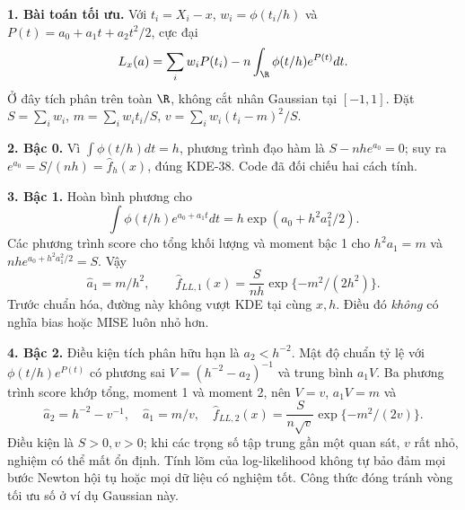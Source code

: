 \begin{solution}
\textbf{1. Bài toán tối ưu.} Với $t_i=X_i-x$, $w_i=\phi(t_i/h)$ và $P(t)=a_0+a_1t+a_2t^2/2$, cực đại
\[
 L_x(a)=\sum_iw_iP(t_i)-n\int_{\R}\phi(t/h)e^{P(t)}dt.
\]
Ở đây tích phân trên toàn $\R$, không cắt nhân Gaussian tại $[-1,1]$.
Đặt $S=\sum_iw_i$, $m=\sum_iw_it_i/S$, $v=\sum_iw_i(t_i-m)^2/S$.

\textbf{2. Bậc 0.} Vì $\int\phi(t/h)dt=h$, phương trình đạo hàm là $S-nhe^{a_0}=0$; suy ra
$e^{a_0}=S/(nh)=\widehat f_h(x)$, đúng KDE-38. Code đã đối chiếu hai cách tính.

\textbf{3. Bậc 1.} Hoàn bình phương cho
\[
 \int\phi(t/h)e^{a_0+a_1t}dt
 =h\exp(a_0+h^2a_1^2/2).
\]
Các phương trình score cho tổng khối lượng và moment bậc 1 cho $h^2a_1=m$ và $nhe^{a_0+h^2a_1^2/2}=S$. Vậy
\[
 \widehat a_1=m/h^2,\qquad
 \widehat f_{LL,1}(x)=\frac{S}{nh}\exp\{-m^2/(2h^2)\}.
\]
Trước chuẩn hóa, đường này không vượt KDE tại cùng $x,h$. Điều đó \emph{không} có nghĩa bias hoặc MISE luôn nhỏ hơn.

\textbf{4. Bậc 2.} Điều kiện tích phân hữu hạn là $a_2<h^{-2}$.
Mật độ chuẩn tỷ lệ với $\phi(t/h)e^{P(t)}$ có phương sai $V=(h^{-2}-a_2)^{-1}$ và trung bình $a_1V$.
Ba phương trình score khớp tổng, moment 1 và moment 2, nên $V=v$, $a_1V=m$ và
\[
 \boxed{\widehat a_2=h^{-2}-v^{-1},\quad
 \widehat a_1=m/v,\quad
 \widehat f_{LL,2}(x)=\frac{S}{n\sqrt v}\exp\{-m^2/(2v)\}.}
\]
Điều kiện là $S>0,v>0$; khi các trọng số tập trung gần một quan sát, $v$ rất nhỏ, nghiệm có thể mất ổn định. Tính lõm của log-likelihood không tự bảo đảm mọi bước Newton hội tụ hoặc mọi dữ liệu có nghiệm tốt. Công thức đóng tránh vòng tối ưu số ở ví dụ Gaussian này.


\end{solution}
